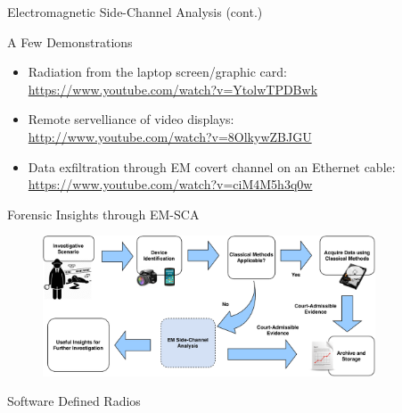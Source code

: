 \documentclass[handout]{beamer}
\begin{document}
\begin{frame}{Electromagnetic Side-Channel Analysis (cont.)}  

\footnotesize
A Few Demonstrations
\vspace{10pt}

\begin{itemize}
	\footnotesize
	\item Radiation from the laptop screen/graphic card:\\ \url{https://www.youtube.com/watch?v=YtolwTPDBwk}
	\vspace{10pt}
	\item Remote servelliance of video displays:\\ \url{http://www.youtube.com/watch?v=8OlkywZBJGU}
	\vspace{10pt}
	\item Data exfiltration through EM covert channel on an Ethernet cable:\\ \url{https://www.youtube.com/watch?v=ciM4M5h3q0w}
\end{itemize}

\end{frame}


\begin{frame}{Forensic Insights through EM-SCA}  

	\begin{figure}
		\includegraphics[width=280pt]{figures/applying-em-sca-to-forensic-process.pdf}
	\end{figure}

\end{frame}



\begin{frame}{}  

	\begin{block}{Software Defined Radios}
	\end{block}

\end{frame}
\end{document}
